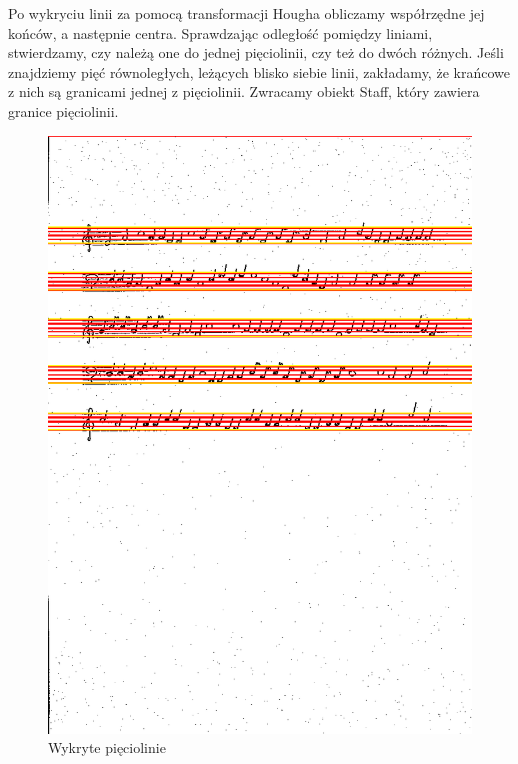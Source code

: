 \documentclass[11pt]{article}
\begin{document}
Po wykryciu linii za pomocą transformacji Hougha obliczamy współrzędne jej końców, a następnie centra.
Sprawdzając odległość pomiędzy liniami, stwierdzamy, czy należą one do jednej pięciolinii, czy też do dwóch różnych.
Jeśli znajdziemy pięć równoległych, leżących blisko siebie linii, zakładamy, że krańcowe z nich są granicami jednej z pięciolinii. 
Zwracamy obiekt Staff, który zawiera granice pięciolinii.

\begin{figure}[h!]
    \centering
    \graphicspath{ {staffs/} }
    \includegraphics[scale=0.15]{staffs4_done.png}
    \caption{Wykryte pięciolinie}
    \label{fig:universe}
    \end{figure}
\end{document}
